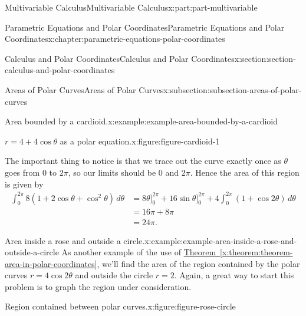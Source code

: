 \documentclass[twoside,10pt,]{book}
\newcommand{\xreffont}{\relax}
\numberwithin{equation}{part}
\newcommand{\amp}{&}
\begin{document}
\begin{partptx}{Multivariable Calculus}{}{Multivariable Calculus}{}{}{x:part:part-multivariable}
\begin{chapterptx}{Parametric Equations and Polar Coordinates}{}{Parametric Equations and Polar Coordinates}{}{}{x:chapter:parametric-equations-polar-coordinates}
\begin{sectionptx}{Calculus and Polar Coordinates}{}{Calculus and Polar Coordinates}{}{}{x:section:section-calculus-and-polar-coordinates}
\begin{subsectionptx}{Areas of Polar Curves}{}{Areas of Polar Curves}{}{}{x:subsection:subsection-areas-of-polar-curves}
\begin{example}{Area bounded by a cardioid.}{x:example:example-area-bounded-by-a-cardioid}
\begin{figureptx}{\(r = 4 + 4\cos\theta\) as a polar equation.}{x:figure:figure-cardioid-1}{}
\begin{image}{0}{1}{0}
{
}%
\end{image}%
\tcblower
\end{figureptx}%
The important thing to notice is that we trace out the curve exactly once as \(\theta\) goes from \(0\) to \(2\pi\), so our limits should be \(0\) and \(2\pi\). Hence the area of this region is given by%
%
\begin{align*}
\int_{0}^{2\pi}8(1+2\cos\theta+\cos^{2}\theta)\,d\theta \amp = 8\theta\Big]_{0}^{2\pi} + 16\sin\theta\Big]_{0}^{2\pi} + 4\int_{0}^{2\pi}(1+\cos2\theta)\,d\theta \\
\amp = 16\pi + 8\pi \\
\amp = 24\pi. 
\end{align*}
\end{example}
%
\begin{example}{Area inside a rose and outside a circle.}{x:example:example-area-inside-a-rose-and-outside-a-circle}%
As another example of the use of \hyperref[x:theorem:theorem-area-in-polar-coordinates]{Theorem~{\xreffont\ref{x:theorem:theorem-area-in-polar-coordinates}}}, we'll find the area of the region contained by the polar curves \(r = 4\cos2\theta\) and outside the circle \(r=2\). Again, a great way to start this problem is to graph the region under consideration.%
\begin{figureptx}{Region contained between polar curves.}{x:figure:figure-rose-circle}{}%
\begin{image}{0}{1}{0}%
\resizebox{\linewidth}{!}{%
\begin{tikzpicture}[scale=.5]


\end{tikzpicture}}
\end{image}
\end{figureptx}
\end{example}
\end{subsectionptx}
\end{sectionptx}
\end{chapterptx}
\end{partptx}
\end{document}
